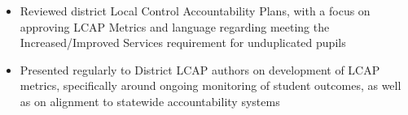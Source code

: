 \begin{cventries}
{\begin{cvitems}
\begin{itemize}
{            inclusive of leaders from Imperial, Orange, Riverside, San Bernardino, and San Diego 
            counties. Topics included data visualization, data needs analysis during COVID-19
            closures, and ESSA Comprehensive Support and Intervention school data analysis.}
            \item {Reviewed district Local Control Accountability Plans, with a focus
            on approving LCAP Metrics and language regarding meeting the
            Increased/Improved Services requirement for unduplicated pupils}
            \item {Presented regularly to District LCAP authors on development of
            LCAP metrics, specifically around ongoing monitoring of student outcomes,
            as well as on alignment to statewide accountability systems}
          \end{itemize}
      \end{cvitems}
    }


\end{cventries}
